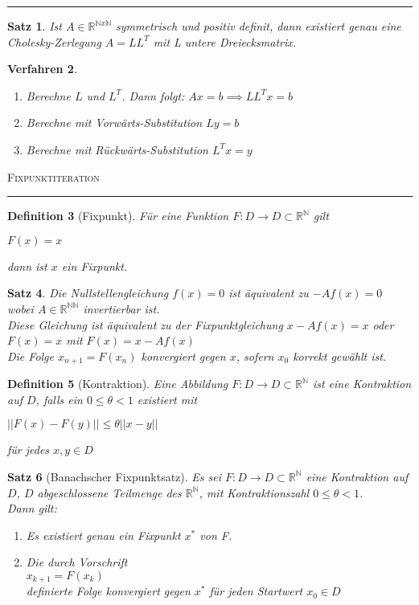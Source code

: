 \documentclass[a4paper]{article}
\newcounter{Sec}
\theoremstyle{marginbreak}
\newtheorem{definition}{Definition}[Sec]
\newtheorem{satz}[definition]{Satz}
\newtheorem{verfahren}[definition]{Verfahren}
\newcommand{\sep}{%
	\rule{\textwidth}{0.3pt}%
	\stepcounter{Sec}%
}
\begin{document}
	\sep
	\begin{satz}
		Ist $ A \in \mathbb{R}^{\mathbb{N}x\mathbb{N}}$ symmetrisch und positiv definit, dann existiert genau eine Cholesky-Zerlegung $A=LL^T$ mit L untere Dreiecksmatrix.
	\end{satz}
	\begin{verfahren}
		\begin{enumerate}
			\item Berechne $L$ und $L^T$. Dann folgt: $Ax = b \implies LL^Tx = b $
			\item Berechne mit Vorwärts-Substitution $Ly = b$
			\item Berechne mit Rückwärts-Substitution $L^Tx = y$
		\end{enumerate}
	\end{verfahren}

	\textsc{Fixpunktiteration}
	\sep
	\begin{definition}[Fixpunkt]
		Für eine Funktion $F : D \to D \subset \mathbb{R}^\mathbb{N}$ gilt
		\begin{description}
			\item $F(x) = x$
		\end{description}
		dann ist $x$ ein Fixpunkt.
	\end{definition}

	\begin{satz}
		Die Nullstellengleichung $f(x) = 0$ ist äquivalent zu $-Af(x) = 0$ wobei $A \in \mathbb{R}^{\mathbb{N}\mathbb{N}}$ invertierbar ist.\\
		Diese Gleichung ist äquivalent zu der Fixpunktgleichung $x - Af(x) = x$ oder $F(x)=x$ mit $F(x) = x - Af(x)$\\
		
		Die Folge $x_{n+1} = F(x_n)$ konvergiert gegen $x$, sofern $x_0$ korrekt gewählt ist.
	\end{satz}

	\begin{definition}[Kontraktion]
		Eine Abbildung $F : D \to D \subset \mathbb{R}^\mathbb{N}$ ist eine Kontraktion auf $D$, falls ein $0 \leq \theta < 1$ existiert mit
		\begin{description}
			\item $||F(x) - F(y)|| \leq \theta ||x - y||$
		\end{description}
		für jedes $x, y \in D$
	\end{definition}

	\begin{satz}[Banachscher Fixpunktsatz]
		Es sei $F : D \to D \subset \mathbb{R}^\mathbb{N}$ eine Kontraktion auf $D$, $D$ abgeschlossene Teilmenge des $\mathbb{R}^\mathbb{N}$, mit Kontraktionszahl $0 \leq \theta < 1$. \\
		Dann gilt:
		\begin{enumerate}
			\item Es existiert genau ein Fixpunkt $x^*$ von F.
			\item Die durch Vorschrift\\
				$x_{k+1} = F(x_k)$ \\
			definierte Folge konvergiert gegen $x^*$ für jeden Startwert $x_0 \in D$ 
		\end{enumerate}
	\end{satz}
\end{document}
